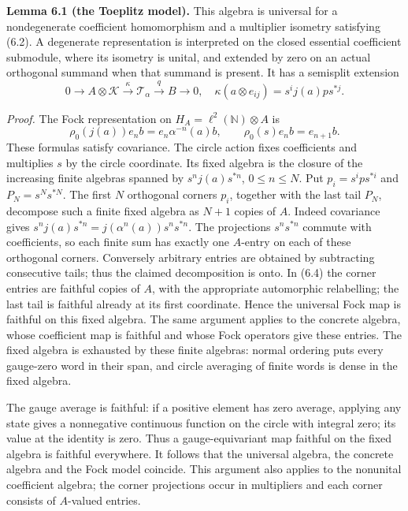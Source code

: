 \documentclass[
  11pt,
]{article}
\begin{document}
\textbf{Lemma 6.1 (the Toeplitz model).} This algebra is universal for a
nondegenerate coefficient homomorphism and a multiplier isometry
satisfying (6.2). A degenerate representation is interpreted on the
closed essential coefficient submodule, where its isometry is unital,
and extended by zero on an actual orthogonal summand when that summand
is present. It has a semisplit extension \[
0\longrightarrow A\otimes\mathcal K
\xrightarrow{\kappa}\mathcal T_\alpha
\xrightarrow{q}B\longrightarrow0,
\quad
\kappa(a\otimes e_{ij})=s^i j(a)p s^{*j}.
\tag{6.3}
\]

\emph{Proof.} The Fock representation on
\(H_A=\ell^2(\mathbb N)\otimes A\) is \[
\rho_0(j(a))e_n b=e_n\alpha^{-n}(a)b,
\qquad \rho_0(s)e_n b=e_{n+1}b.
\tag{6.4}
\] These formulas satisfy covariance. The circle action fixes
coefficients and multiplies \(s\) by the circle coordinate. Its fixed
algebra is the closure of the increasing finite algebras spanned by
\(s^n j(a)s^{*n}\), \(0\le n\le N\). Put \(p_i=s^ips^{*i}\) and
\(P_N=s^Ns^{*N}\). The first \(N\) orthogonal corners \(p_i\), together
with the last tail \(P_N\), decompose such a finite fixed algebra as
\(N+1\) copies of \(A\). Indeed covariance gives
\(s^n j(a)s^{*n}=j(\alpha^n(a))s^ns^{*n}\). The projections
\(s^ns^{*n}\) commute with coefficients, so each finite sum has exactly
one \(A\)-entry on each of these orthogonal corners. Conversely
arbitrary entries are obtained by subtracting consecutive tails; thus
the claimed decomposition is onto. In (6.4) the corner entries are
faithful copies of \(A\), with the appropriate automorphic relabelling;
the last tail is faithful already at its first coordinate. Hence the
universal Fock map is faithful on this fixed algebra. The same argument
applies to the concrete algebra, whose coefficient map is faithful and
whose Fock operators give these entries. The fixed algebra is exhausted
by these finite algebras: normal ordering puts every gauge-zero word in
their span, and circle averaging of finite words is dense in the fixed
algebra.

The gauge average is faithful: if a positive element has zero average,
applying any state gives a nonnegative continuous function on the circle
with integral zero; its value at the identity is zero. Thus a
gauge-equivariant map faithful on the fixed algebra is faithful
everywhere. It follows that the universal algebra, the concrete algebra
and the Fock model coincide. This argument also applies to the nonunital
coefficient algebra; the corner projections occur in multipliers and
each corner consists of \(A\)-valued entries.
\end{document}
